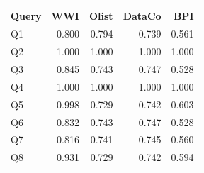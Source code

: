 \begin{tabular}{lrrrr}
\toprule
Query & WWI & Olist & DataCo & BPI \\
\midrule
Q1 & 0.800 & 0.794 & 0.739 & 0.561 \\
Q2 & 1.000 & 1.000 & 1.000 & 1.000 \\
Q3 & 0.845 & 0.743 & 0.747 & 0.528 \\
Q4 & 1.000 & 1.000 & 1.000 & 1.000 \\
Q5 & 0.998 & 0.729 & 0.742 & 0.603 \\
Q6 & 0.832 & 0.743 & 0.747 & 0.528 \\
Q7 & 0.816 & 0.741 & 0.745 & 0.560 \\
Q8 & 0.931 & 0.729 & 0.742 & 0.594 \\
\bottomrule
\end{tabular}

